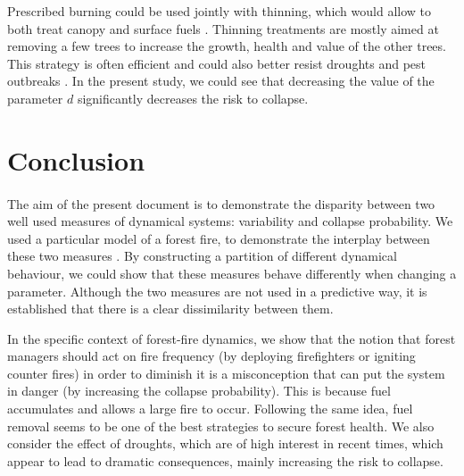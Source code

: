 \documentclass{article}
\begin{document}
Prescribed burning could be used jointly with thinning, which would allow to both treat canopy and surface fuels \citep{kalies_tamm_2016, agee_basic_2005}. Thinning treatments are mostly aimed at removing a few trees to increase the growth, health and value of the other trees. This strategy is often efficient \citep{hurteau2008carbon} and could also better resist droughts \citep{d2013effects} and pest outbreaks \citep{waring2005silvicultural}. In the present study, we could see that decreasing the value of the parameter $d$ significantly decreases the risk to collapse.








\newpage

\section*{Conclusion}

\paragraph{}
The aim of the present document is to demonstrate the disparity between two well used measures of dynamical systems: variability and collapse probability. We used a particular model of a forest fire, to demonstrate the interplay between these two measures . By constructing a partition of different dynamical behaviour, we could show that these measures behave differently when changing a parameter. Although the two measures are not used in a predictive way, it is established that there is a clear dissimilarity between them.

In the specific context of forest-fire dynamics, we show that the notion that forest managers should act on fire frequency (by deploying firefighters or igniting counter fires) in order to diminish it is a misconception that can put the system in danger (by increasing the collapse probability). This is because fuel accumulates and allows a large fire to occur. Following the same idea, fuel removal seems to be one of the best strategies to secure forest health. We also consider the effect of droughts, which are of high interest in recent times, which appear to lead to dramatic consequences, mainly increasing the risk to collapse.
\end{document}
